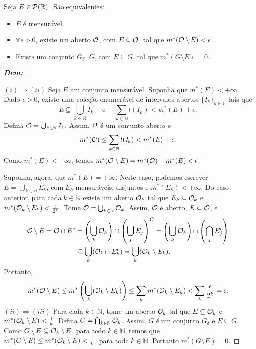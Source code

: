 \begin{theorem*}{}
Seja $E \in \mathcal{P}(\mathbb{R})$. São equivalentes:
\begin{itemize}
    \item[i)] $E$ é mensurável.
    \item[ii)] $\forall \epsilon > 0$, existe um aberto $\mathcal O$, 
      com $E \subseteq \mathcal O$, tal que $m^*(\mathcal O \setminus E) < \epsilon$.
    \item[iii)] Existe um conjunto $G_\delta$, $G$, com $E \subseteq G$, tal que $m^*(G \setminus E) = 0$.
\end{itemize}
\end{theorem*}

\begin{proof}[\textbf{Dem:}]. 

\noindent
$(i) \Rightarrow (ii)$ Seja $E$ um conjunto mensurável. Suponha que $m^*(E) < +\infty$.
  Dado $\epsilon > 0$, existe uma coleção enumerável de intervalos abertos
  $\{I_k\}_{k \in \mathbb{N}}$ tais que 
  $$E \subseteq \bigcup_{k \in \mathbb{N}} I_k \quad 
  \text{ e }\quad \sum_{k \in \mathbb{N}} l(I_k) < m^*(E) + \epsilon.$$ 
Defina $\mathcal O = \bigcup_{k \in \mathbb{N}} I_k$.
Assim, $\mathcal O$ é um conjunto aberto e 
  $$m^*(\mathcal O) \le \sum_{k \in \mathbb{N}} l(I_k) < m^*(E) + \epsilon.$$
Como $m^*(E) < +\infty$, temos $m^*(\mathcal O \setminus E) = m^*(\mathcal O) - m^*(E) < \epsilon$.

Suponha, agora, que $m^*(E) = +\infty$. Neste caso, podemos escrever
  $E = \bigcup_{k \in \mathbb{N}} E_k$, com $E_k$ mensuráveis, disjuntos e $m^*(E_k) < +\infty$.
  Do caso anterior, para cada $k \in \mathbb{N}$ existe um aberto $\mathcal O_k$ tal que
  $E_k \subseteq \mathcal O_k$ e $m^*(\mathcal O_k \setminus E_k) < \frac{\epsilon}{2^k}$.
Tome $\mathcal O = \bigcup_{k \in \mathbb{N}} \mathcal O_k$. Assim, $\mathcal O$ é aberto,
  $E \subseteq \mathcal O$, e
  \begin{align*}
    \mathcal O \setminus E = \mathcal O \cap E^c &= 
  \left(\bigcup_k \mathcal O_k\right) \cap \left(\bigcup_j E_j\right)^C 
  = \left(\bigcup_k \mathcal O_k\right) \cap \left(\bigcap_j E_j^c\right) \\
    &\subseteq \bigcup_k (\mathcal O_k \cap E_k^c) = \bigcup_k (\mathcal O_k \setminus E_k).
  \end{align*}
Portanto, 
  $$m^*(\mathcal O \setminus E) \le m^*\left(\bigcup_k (\mathcal O_k \setminus E_k)\right)
  \le \sum_k m^*(\mathcal O_k \setminus E_k) < \sum_k \frac{\epsilon}{2^k} = \epsilon.$$
$(ii) \Rightarrow (iii)$ Para cada $k \in \mathbb{N}$, tome um aberto $\mathcal O_k$ tal que
  $E \subseteq \mathcal O_k$ e $m^*(\mathcal O_k \setminus E) < \frac{1}{k}$.
  Defina $G = \bigcap_{k \in \mathbb{N}} \mathcal O_k$. Assim, $G$ é um conjunto
  $G_\delta$ e $E \subseteq G$. Como $G \setminus E \subseteq \mathcal O_k \setminus E$, 
  para todo  $k \in \mathbb{N}$, temos que $m^*(G \setminus E) \le m^*(\mathcal O_k \setminus E)
  < \frac{1}{k}$, para todo $k \in \mathbb{N}$. Portanto $m^*(G \setminus E) = 0$.


\end{proof}
